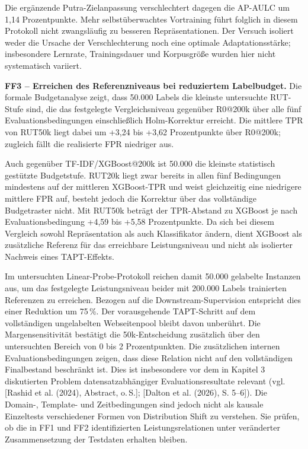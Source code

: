 Die ergänzende Putra-Zielanpassung verschlechtert dagegen die AP-AULC um
1,14 Prozentpunkte. Mehr selbstüberwachtes Vortraining führt folglich in diesem
Protokoll nicht zwangsläufig zu besseren Repräsentationen. Der Versuch isoliert
weder die Ursache der Verschlechterung noch eine optimale Adaptationsstärke;
insbesondere Lernrate, Trainingsdauer und Korpusgröße wurden hier nicht systematisch variiert.

\textbf{FF3 -- Erreichen des Referenzniveaus bei reduziertem Labelbudget.}
Die formale Budgetanalyse zeigt, dass 50.000 Labels die kleinste untersuchte RUT-Stufe
sind, die das festgelegte Vergleichsniveau gegenüber R0@200k über alle fünf
Evaluationsbedingungen einschließlich Holm-Korrektur erreicht. Die mittlere TPR von
RUT50k liegt dabei um +3,24 bis +3,62 Prozentpunkte über R0@200k; zugleich fällt die
realisierte FPR niedriger aus.

Auch gegenüber TF-IDF/XGBoost@200k ist 50.000 die kleinste statistisch gestützte
Budgetstufe. RUT20k liegt zwar bereits in allen fünf Bedingungen mindestens auf der
mittleren XGBoost-TPR und weist gleichzeitig eine niedrigere mittlere FPR auf, besteht
jedoch die Korrektur über das vollständige Budgetraster nicht. Mit RUT50k beträgt der
TPR-Abstand zu XGBoost je nach Evaluationsbedingung +4,59 bis +5,58 Prozentpunkte.
Da sich bei diesem Vergleich sowohl Repräsentation als auch Klassifikator ändern, dient
XGBoost als zusätzliche Referenz für das erreichbare Leistungsniveau und nicht als isolierter
Nachweis eines TAPT-Effekts.

Im untersuchten Linear-Probe-Protokoll reichen damit 50.000 gelabelte Instanzen aus, um
das festgelegte Leistungsniveau beider mit 200.000 Labels trainierten Referenzen zu erreichen.
Bezogen auf die Downstream-Supervision entspricht dies einer Reduktion um 75\,\%. Der
vorausgehende TAPT-Schritt auf dem vollständigen ungelabelten Webseitenpool bleibt davon
unberührt. Die Margensensitivität bestätigt die 50k-Entscheidung zusätzlich über den
untersuchten Bereich von 0 bis 2 Prozentpunkten. Die zusätzlichen internen Evaluationsbedingungen zeigen, dass diese Relation nicht auf den
vollständigen Finalbestand beschränkt ist. Dies ist insbesondere vor dem in Kapitel 3
diskutierten Problem datensatzabhängiger Evaluationsresultate relevant
(vgl. [Rashid et al. (2024), Abstract, o.\,S.]; [Dalton et al. (2026), S. 5--6]). Die Domain-,
Template- und Zeitbedingungen sind jedoch nicht als kausale Einzeltests verschiedener Formen
von Distribution Shift zu verstehen. Sie prüfen, ob die in FF1 und FF2 identifizierten
Leistungsrelationen unter veränderter Zusammensetzung der Testdaten erhalten bleiben.

